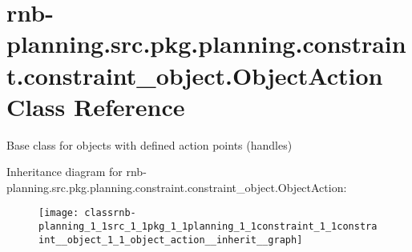 \hypertarget{classrnb-planning_1_1src_1_1pkg_1_1planning_1_1constraint_1_1constraint__object_1_1_object_action}{}\section{rnb-\/planning.src.\+pkg.\+planning.\+constraint.\+constraint\+\_\+object.\+Object\+Action Class Reference}
\label{classrnb-planning_1_1src_1_1pkg_1_1planning_1_1constraint_1_1constraint__object_1_1_object_action}


Base class for objects with defined action points (handles)  




Inheritance diagram for rnb-\/planning.src.\+pkg.\+planning.\+constraint.\+constraint\+\_\+object.\+Object\+Action\+:
\nopagebreak
\begin{figure}[H]
\begin{center}
\leavevmode
\texttt{[image: classrnb-planning\_1\_1src\_1\_1pkg\_1\_1planning\_1\_1constraint\_1\_1constraint\_\_object\_1\_1\_object\_action\_\_inherit\_\_graph]}
\end{center}
\end{figure}
